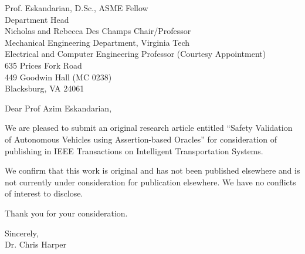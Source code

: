 \documentclass[11pt, a4paper]{letter} %
\begin{document}

\begin{letter}{
	Prof. Eskandarian, D.Sc., ASME Fellow\\
	Department Head\\
	Nicholas and Rebecca Des Champs Chair/Professor \\
	Mechanical Engineering Department, Virginia Tech\\
	Electrical and Computer Engineering Professor (Courtesy Appointment)\\
	635 Prices Fork Road\\ 
	449 Goodwin Hall (MC 0238)\\
	Blacksburg, VA 24061\\
}


\opening{Dear Prof Azim Eskandarian,}

\noindent We are pleased to submit an original research article entitled “Safety Validation of Autonomous Vehicles using Assertion-based Oracles” for consideration of publishing in IEEE Transactions on Intelligent Transportation Systems. 

\noindent We confirm that this work is original and has not been published elsewhere and is not currently under consideration for publication elsewhere. We have no conflicts of interest to disclose. 

\noindent Thank you for your consideration. 

\noindent Sincerely,\\


\noindent Dr. Chris Harper





\end{letter}
\end{document}
